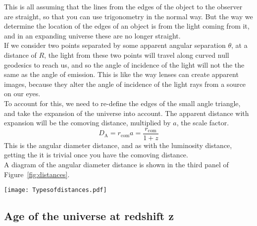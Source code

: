 \documentclass[]{article}
\begin{document}
\noindent This is all assuming that the lines from the edges of the object to the observer are straight, so that you can use trigonometry in the normal way. But the way we determine the location of the edges of an object is from the light coming from it, and in an expanding universe these are no longer straight. \\

\noindent If we consider two points separated by some apparent angular separation $\theta$, at a distance of $R$, the light from these two points will travel along curved null geodesics to reach us, and so the angle of incidence of the light will not the the same as the angle of emission. This is like the way lenses can create apparent images, because they alter the angle of incidence of the light rays from a source on our eyes. \\

\noindent To account for this, we need to re-define the edges of the small angle triangle, and take the expansion of the universe into account. The apparent distance with expansion will be the comoving distance, multiplied by $a$, the scale factor. 
\begin{equation}
\boxed{D_\mathrm{A} = r_\mathrm{com} a = \frac{r_\mathrm{com}}{1+z}}
\end{equation}
This is the angular diameter distance, and as with the luminosity distance, getting the it is trivial once you have the comoving distance. \\

\noindent A diagram of the angular diameter distance is shown in the third panel of Figure~\ref{fig:distances}.

\begin{figure*}[h!]
\hspace*{-2.7cm}
\texttt{[image: Typesofdistances.pdf]}
\caption{The three types of distances: Comoving distance, luminosity distance and angular diameter distance.}
\label{fig:distances}
\end{figure*}

\subsection{Age of the universe at redshift z}
\end{document}
